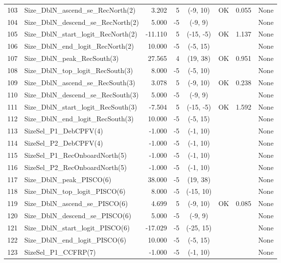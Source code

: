 \documentclass[12pt,]{article}
\begin{document}
\begin{landscape}
\begin{longtable}{rlrrcccp{1.5in}}
  103 & Size\_DblN\_ascend\_se\_RecNorth(2) & 3.202 & 5 & (-9, 10) & OK & 0.055 & None \\ 
  104 & Size\_DblN\_descend\_se\_RecNorth(2) & 5.000 & -5 & (-9, 9) &  &  & None \\ 
  105 & Size\_DblN\_start\_logit\_RecNorth(2) & -11.110 & 5 & (-15, -5) & OK & 1.137 & None \\ 
  106 & Size\_DblN\_end\_logit\_RecNorth(2) & 10.000 & -5 & (-5, 15) &  &  & None \\ 
  107 & Size\_DblN\_peak\_RecSouth(3) & 27.565 & 4 & (19, 38) & OK & 0.951 & None \\ 
  108 & Size\_DblN\_top\_logit\_RecSouth(3) & 8.000 & -5 & (-5, 10) &  &  & None \\ 
  109 & Size\_DblN\_ascend\_se\_RecSouth(3) & 3.078 & 5 & (-9, 10) & OK & 0.238 & None \\ 
  110 & Size\_DblN\_descend\_se\_RecSouth(3) & 5.000 & -5 & (-9, 9) &  &  & None \\ 
  111 & Size\_DblN\_start\_logit\_RecSouth(3) & -7.504 & 5 & (-15, -5) & OK & 1.592 & None \\ 
  112 & Size\_DblN\_end\_logit\_RecSouth(3) & 10.000 & -5 & (-5, 15) &  &  & None \\ 
  113 & SizeSel\_P1\_DebCPFV(4) & -1.000 & -5 & (-1, 10) &  &  & None \\ 
  114 & SizeSel\_P2\_DebCPFV(4) & -1.000 & -5 & (-1, 10) &  &  & None \\ 
  115 & SizeSel\_P1\_RecOnboardNorth(5) & -1.000 & -5 & (-1, 10) &  &  & None \\ 
  116 & SizeSel\_P2\_RecOnboardNorth(5) & -1.000 & -5 & (-1, 10) &  &  & None \\ 
  117 & Size\_DblN\_peak\_PISCO(6) & 38.000 & -5 & (19, 38) &  &  & None \\ 
  118 & Size\_DblN\_top\_logit\_PISCO(6) & 8.000 & -5 & (-15, 10) &  &  & None \\ 
  119 & Size\_DblN\_ascend\_se\_PISCO(6) & 4.699 & 5 & (-9, 10) & OK & 0.085 & None \\ 
  120 & Size\_DblN\_descend\_se\_PISCO(6) & 5.000 & -5 & (-9, 9) &  &  & None \\ 
  121 & Size\_DblN\_start\_logit\_PISCO(6) & -17.029 & -5 & (-25, 15) &  &  & None \\ 
  122 & Size\_DblN\_end\_logit\_PISCO(6) & 10.000 & -5 & (-5, 15) &  &  & None \\ 
  123 & SizeSel\_P1\_CCFRP(7) & -1.000 & -5 & (-1, 10) &  &  & None \\ 

\end{longtable}
\end{landscape}
\end{document}
